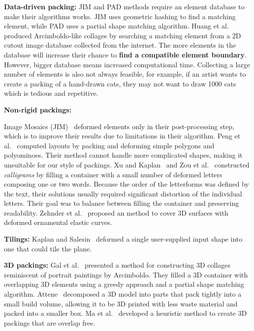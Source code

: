 \textbf{Data-driven packing:}
JIM and PAD methods require an element database to make their algorithms works.
JIM uses geometric hashing to find a matching element, 
while PAD uses a partial shape matching algorithm.
Huang et al.~\cite{Huang2011} produced Arcimboldo-like collages
by searching a matching element from a 2D cutout image database collected from the internet.  
The more elements in the database will increase their chance to \textbf{find a compatible element boundary}.
However, bigger database means increased computational time.
Collecting a large number of elements is also not always feasible,
for example, if an artist wants to create a packing of a hand-drawn cats,
they may not want to draw 1000 cats which is tedious and repetitive.


\textbf{Non-rigid packings:}

Image Mosaics (JIM)~\cite{Kim2002} deformed elements
only in their post-processing step, which is to improve their results due to limitations in their algorithm.
Peng et al.~\cite{Peng2014} computed layouts by packing and deforming
simple polygons and polyominoes. Their method cannot handle more
complicated shapes, making it unsuitable for our style of packings.
Xu and Kaplan~\cite{Xu2007} and Zou et al.~\cite{Zou2016}
constructed \textit{calligrams} by filling a container with a small
number of deformed letters composing one or two words.  Because the
order of the letterforms was defined by the text, their solutions
usually required significant distortion of the individual letters.
Their goal was to balance between filling the container and preserving
readability.
Zehnder et al.~\cite{Zehnder2016} proposed an method to
cover 3D surfaces with deformed ornamental elastic curves.



\textbf{Tilings:}
Kaplan and Salesin~\cite{Kaplan2000} deformed a single user-supplied 
input shape into one that could tile the plane.

\textbf{3D packings:}
Gal et al.~\cite{Gal2007B} presented a method for constructing 3D
collages reminiscent of portrait paintings by Arcimboldo.  They
filled a 3D container with overlapping 3D elements using a greedy
approach and a partial shape matching algorithm.
Attene~\cite{Attene2015} decomposed a 3D model into parts that pack
tightly into a small build volume, allowing it to 
be 3D printed with less waste material and packed into a smaller box.
Ma et al.~\cite{Ma2018} developed a heuristic method
to create 3D packings that are overlap free.

